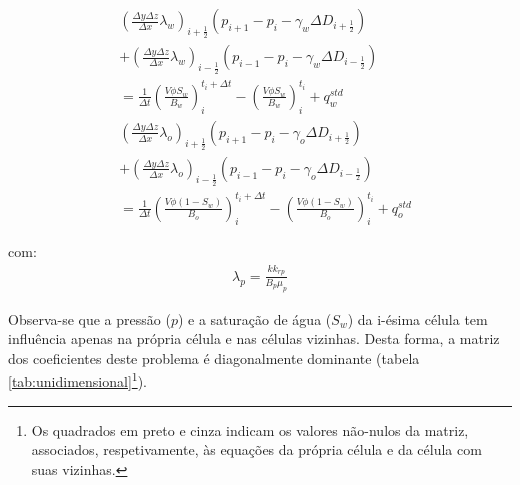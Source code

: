 \documentclass[final,5p]{elsarticle}
\numberwithin{equation}{section}
\begin{document}
        \begin{align}
            &\left( \frac{\Delta y \Delta z}{\Delta x} \lambda_w \right)_{i+\tfrac{1}{2}} (p_{i+1} - p_{i} - \gamma_w \Delta D_{i+\tfrac{1}{2}})  \nonumber \\
            &+ \left( \frac{\Delta y \Delta z}{\Delta x} \lambda_w \right)_{i-\tfrac{1}{2}} (p_{i-1} - p_{i} - \gamma_w \Delta D_{i-\tfrac{1}{2}}) \nonumber \\
            &  = \frac{1}{\Delta t} \left(\frac{V \phi S_w}{B_w}\right)_i^{t_i+\Delta t} - \left(\frac{V \phi S_w}{B_w}\right)_i^{t_i} + q^{std}_w \label{eq:blackoilumdw} \\
            &\left( \frac{\Delta y \Delta z}{\Delta x} \lambda_o \right)_{i+\tfrac{1}{2}} (p_{i+1} - p_{i} - \gamma_o \Delta D_{i+\tfrac{1}{2}})  \nonumber \\
            &+ \left( \frac{\Delta y \Delta z}{\Delta x} \lambda_o \right)_{i-\tfrac{1}{2}} (p_{i-1} - p_{i} - \gamma_o \Delta D_{i-\tfrac{1}{2}}) \nonumber \\
            &  = \frac{1}{\Delta t} \left(\frac{V \phi (1-S_w)}{B_o}\right)_i^{t_i+\Delta t} - \left(\frac{V \phi (1-S_w)}{B_o}\right)_i^{t_i} + q^{std}_o \label{eq:blackoilumdo}
        \end{align}

        \noindent com:
        \begin{align}
            \lambda_p = \frac{k k_{rp}}{B_p \mu_p} \nonumber
        \end{align}

        Observa-se que a pressão ($p$) e a saturação de água ($S_w$) da i-ésima célula tem influência apenas na própria célula e nas células vizinhas. Desta forma, a matriz dos coeficientes deste problema é diagonalmente dominante (tabela \ref{tab:unidimensional}\footnote{Os quadrados em preto e cinza indicam os valores não-nulos da matriz, associados, respetivamente, às equações da própria célula e da célula com suas vizinhas.}).
\end{document}
